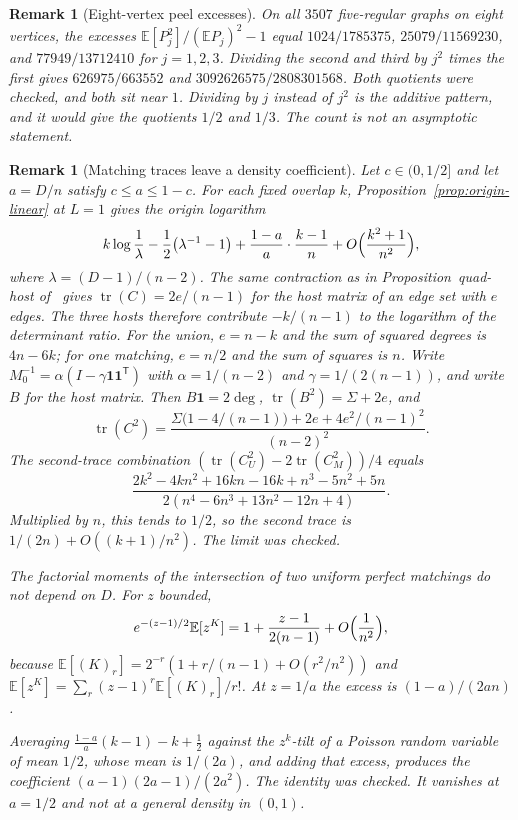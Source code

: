 \documentclass[11pt]{article}
\newtheorem{remark}[theorem]{Remark}
\newcommand{\EE}{\mathbb{E}}
\begin{document}
\begin{remark}[Eight-vertex peel excesses]
\label{rem:peel-eight}
On all \(3507\) five-regular graphs on eight vertices, the excesses
\(\EE[P_j^2]/(\EE P_j)^2-1\) equal \(1024/1785375\), \(25079/11569230\), and
\(77949/13712410\) for \(j=1,2,3\).
Dividing the second and third by \(j^2\) times the first gives
\(626975/663552\) and \(3092626575/2808301568\).
Both quotients were checked, and both sit near \(1\).
Dividing by \(j\) instead of \(j^2\) is the additive pattern, and it would give
the quotients \(1/2\) and \(1/3\).
The count is not an asymptotic statement.
\end{remark}

\begin{remark}[Matching traces leave a density coefficient]
\label{rem:matching-trace-coefficient}
Let \(c\in(0,1/2]\) and let \(a=D/n\) satisfy \(c\le a\le 1-c\).
For each fixed overlap \(k\), Proposition~\ref{prop:origin-linear} at \(L=1\)
gives the origin logarithm
\[
k\log\frac1\lambda-\frac12\bigl(\lambda^{-1}-1\bigr)
+\frac{1-a}{a}\cdot\frac{k-1}{n}
+O\Bigl(\frac{k^2+1}{n^2}\Bigr),
\]
where \(\lambda=(D-1)/(n-2)\).
The same contraction as in Proposition~quad-host of~\cite{PlusOneV1} gives
\(\operatorname{tr}(C)=2e/(n-1)\) for the host matrix of an edge set with \(e\)
edges. The three hosts therefore contribute \(-k/(n-1)\) to the logarithm of
the determinant ratio.
For the union, \(e=n-k\) and the sum of squared degrees is \(4n-6k\); for one
matching, \(e=n/2\) and the sum of squares is \(n\).
Write \(M_0^{-1}=\alpha(I-\gamma\mathbf{1}\mathbf{1}^{\mathsf T})\) with
\(\alpha=1/(n-2)\) and \(\gamma=1/(2(n-1))\), and write \(B\) for the host
matrix. Then \(B\mathbf{1}=2\deg\), \(\operatorname{tr}(B^2)=\Sigma+2e\), and
\[
\operatorname{tr}(C^2)
=
\frac{\Sigma\bigl(1-4/(n-1)\bigr)+2e+4e^2/(n-1)^2}{(n-2)^2}.
\]
The second-trace
combination \((\operatorname{tr}(C_U^2)-2\operatorname{tr}(C_M^2))/4\) equals
\[
\frac{2k^2-4kn^2+16kn-16k+n^3-5n^2+5n}{2(n^4-6n^3+13n^2-12n+4)}.
\]
Multiplied by \(n\), this tends to \(1/2\), so the second trace is
\(1/(2n)+O((k+1)/n^2)\). The limit was checked.

The factorial moments of the intersection of two uniform perfect matchings do
not depend on \(D\). For \(z\) bounded,
\[
e^{-(z-1)/2}\EE[z^K]
=
1+\frac{z-1}{2(n-1)}+O\Bigl(\frac1{n^2}\Bigr),
\]
because \(\EE[(K)_r]=2^{-r}(1+r/(n-1)+O(r^2/n^2))\) and
\(\EE[z^K]=\sum_r(z-1)^r\EE[(K)_r]/r!\).
At \(z=1/a\) the excess is \((1-a)/(2an)\).

Averaging \(\frac{1-a}{a}(k-1)-k+\frac12\) against the \(z^k\)-tilt of a
Poisson random variable of mean \(1/2\), whose mean is \(1/(2a)\), and adding
that excess, produces the coefficient \((a-1)(2a-1)/(2a^2)\). The identity
was checked. It vanishes at \(a=1/2\) and not at a general density in
\((0,1)\).


\end{remark}
\end{document}
